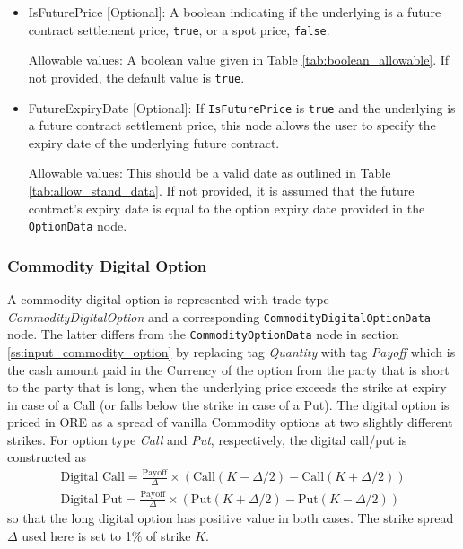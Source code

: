 \begin{itemize}
\item IsFuturePrice [Optional]: A boolean indicating if the underlying is a future contract settlement price, \lstinline!true!, or a spot price, \lstinline!false!.

Allowable values: A boolean value given in Table \ref{tab:boolean_allowable}. If not provided, the default value is \lstinline!true!.

\item FutureExpiryDate [Optional]: If \lstinline!IsFuturePrice! is \lstinline!true! and the underlying is a future contract settlement price, this node allows the user to specify the expiry date of the underlying future contract.

Allowable values: This should be a valid date as outlined in Table \ref{tab:allow_stand_data}. If not provided, it is assumed that the future contract's expiry date is equal to the option expiry date provided in the \lstinline!OptionData! node.
\end{itemize}


\subsubsection{Commodity Digital Option}
\label{ss:input_commodity_digital_option}

A commodity digital option is represented with trade type  \emph{CommodityDigitalOption} and a corresponding
\lstinline!CommodityDigitalOptionData! node.
The latter differs from the \lstinline!CommodityOptionData! node in section \ref{ss:input_commodity_option} by replacing tag \emph{Quantity}
with tag \emph{Payoff} which is the cash amount paid in the Currency of the option from the party that is short to the party that is long, when the underlying price exceeds the strike at expiry in case of a Call (or falls below the strike in case of a Put). The digital option is priced in ORE as a spread of vanilla Commodity options at two slightly different strikes. For option type \emph{Call}
and \emph{Put}, respectively, the digital call/put is constructed as
\begin{align*}
\mbox{Digital Call} =  \frac{\mbox{Payoff}}{\Delta}  \times  \left( \mbox{Call}(K- \Delta/2) - \mbox{Call}(K+ \Delta/2) \right) \\
\mbox{Digital Put} = \frac{\mbox{Payoff}}{\Delta}  \times \left( \mbox{Put}(K+ \Delta/2) - \mbox{Put}(K- \Delta/2)  \right)
\end{align*}
so that the long digital option has positive value in both cases. The strike spread $\Delta$ used here is set to 1\% of strike $K$.

